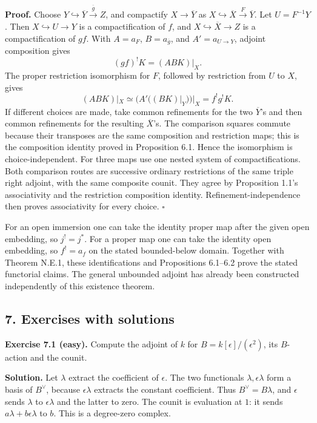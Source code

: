 \documentclass[11pt]{article}
\begin{document}
\textbf{Proof.} Choose
\(Y\hookrightarrow\overline Y\xrightarrow{\overline g}Z\), and
compactify \(X\to\overline Y\) as
\(X\hookrightarrow\overline X\xrightarrow{F}\overline Y\). Let
\(U=F^{-1}Y\). Then \(X\hookrightarrow U\to Y\) is a compactification of
\(f\), and \(X\hookrightarrow\overline X\to Z\) is a compactification of
\(gf\). With \(A=a_F\), \(B=a_{\overline g}\), and \(A'=a_{U\to Y}\),
adjoint composition gives \[
(gf)^!K=(ABK)|_X.
\] The proper restriction isomorphism for \(F\), followed by restriction
from \(U\) to \(X\), gives \[
(ABK)|_X\simeq (A'((BK)|_Y))|_X=f^!g^!K.
\] If different choices are made, take common refinements for the two
\(\overline Y\)'s and then common refinements for the resulting
\(\overline X\)'s. The comparison squares commute because their
transposes are the same composition and restriction maps; this is the
composition identity proved in Proposition 6.1. Hence the isomorphism is
choice-independent. For three maps use one nested system of
compactifications. Both comparison routes are successive ordinary
restrictions of the same triple right adjoint, with the same composite
counit. They agree by Proposition 1.1's associativity and the
restriction composition identity. Refinement-independence then proves
associativity for every choice. \(\square\)

For an open immersion one can take the identity proper map after the
given open embedding, so \(j^!=j^*\). For a proper map one can take the
identity open embedding, so \(f^!=a_f\) on the stated bounded-below
domain. Together with Theorem N.E.1, these identifications and
Propositions 6.1--6.2 prove the stated functorial claims. The general
unbounded adjoint has already been constructed independently of this
existence theorem.

\subsection{7. Exercises with solutions}\label{exercises-with-solutions}

\textbf{Exercise 7.1 (easy).} Compute the adjoint of \(k\) for
\(B=k[\epsilon]/(\epsilon^2)\), its \(B\)-action and the counit.

\textbf{Solution.} Let \(\lambda\) extract the coefficient of
\(\epsilon\). The two functionals \(\lambda,\epsilon\lambda\) form a
basis of \(B^\vee\), because \(\epsilon\lambda\) extracts the constant
coefficient. Thus \(B^\vee=B\lambda\), and \(\epsilon\) sends
\(\lambda\) to \(\epsilon\lambda\) and the latter to zero. The counit is
evaluation at \(1\): it sends \(a\lambda+b\epsilon\lambda\) to \(b\).
This is a degree-zero complex.
\end{document}
